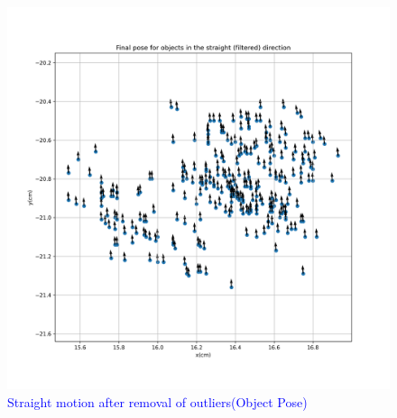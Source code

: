       \begin{figure}[H] 
                \centering
                 \includegraphics[width=\textwidth]{"images/experiment_5/Final_pose_for_objects_in_the_straight (filtered)_direction.png"}
                \caption{\textcolor{blue}{Straight motion after removal of outliers(Object Pose)}}
                \label{fig:exp05-straight-end-poses-after}
      \end{figure}


